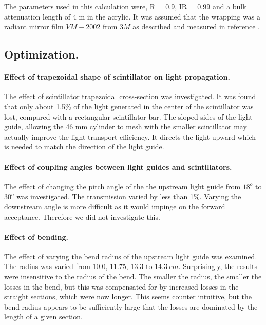  
The parameters used in this calculation were, R = 0.9, IR = 0.99 and a bulk attenuation length of 4 m in the acrylic. 
It was assumed that the wrapping was a radiant mirror film $VM-2002$ from $3M$ as described and measured in reference \cite{mutch}.

\subsection{Optimization.}
\paragraph{Effect of trapezoidal shape of scintillator on light propagation.}
The effect of scintillator trapezoidal cross-section was investigated. 
It was found that only about 1.5\% of the light generated in the center of the scintillator was lost, compared with a rectangular scintillator bar. 
The sloped sides of the light guide, allowing the 46 mm cylinder to mesh with the smaller scintillator may actually improve the light transport efficiency. It directs the light upward which is needed to match the direction of the light guide. 
\paragraph{Effect of coupling angles between light guides and scintillators.}
The effect of changing the pitch angle of the the upstream light guide from $18^o$ to $30^o$ was investigated. The transmission varied by less than 1\%.
Varying the downstream angle is more difficult as it would impinge on the forward acceptance.
Therefore we did not investigate this.

\paragraph{Effect of bending.}

The effect of varying the bend radius of the upstream light guide was examined.
The radius was varied from 10.0, 11.75, 13.3 to 1$4.3~cm$. 
Surprisingly, the results were insensitive to the radius of the bend.
The smaller the radius, the smaller the losses in the bend, but this was compensated for by increased losses in the straight sections, which were now longer.
This seems counter intuitive, but the bend radius appears to be sufficiently large that the losses are dominated by the length of a given section.  

